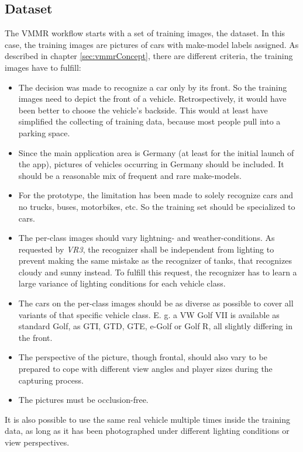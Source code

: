 \subsection{Dataset}\label{sec:dataset}
The VMMR workflow starts with a set of training images, the dataset. In this case, the training images are pictures of cars with make-model labels assigned. As described in chapter \ref{sec:vmmrConcept}, there are different criteria, the training images have to fulfill:
\begin{itemize}
  \item The decision was made to recognize a car only by its front. So the training images need to depict the front of a vehicle. Retrospectively, it would have been better to choose the vehicle's backside. This would at least have simplified the collecting of training data, because most people pull into a parking space.
  \item Since the main application area is Germany (at least for the initial launch of the app), pictures of vehicles occurring in Germany should be included. It should be a reasonable mix of frequent and rare make-models.
  \item For the prototype, the limitation has been made to solely recognize cars and no trucks, buses, motorbikes, etc. So the training set should be specialized to cars.
  \item The per-class images should vary lightning- and weather-conditions. As requested by \emph{VR3}, the recognizer shall be independent from lighting to prevent making the same mistake as the recognizer of tanks, that recognizes cloudy and sunny instead. To fulfill this request, the recognizer has to learn a large variance of lighting conditions for each vehicle class.
  \item The cars on the per-class images should be as diverse as possible to cover all variants of that specific vehicle class. E. g. a VW Golf VII is available as standard Golf, as GTI, GTD, GTE, e-Golf or Golf R, all slightly differing in the front.
  \item The perspective of the picture, though frontal, should also vary to be prepared to cope with different view angles and player sizes during the capturing process.
  \item The pictures must be occlusion-free.
\end{itemize}
It is also possible to use the same real vehicle multiple times inside the training data, as long as it has been photographed under different lighting conditions or view perspectives.

